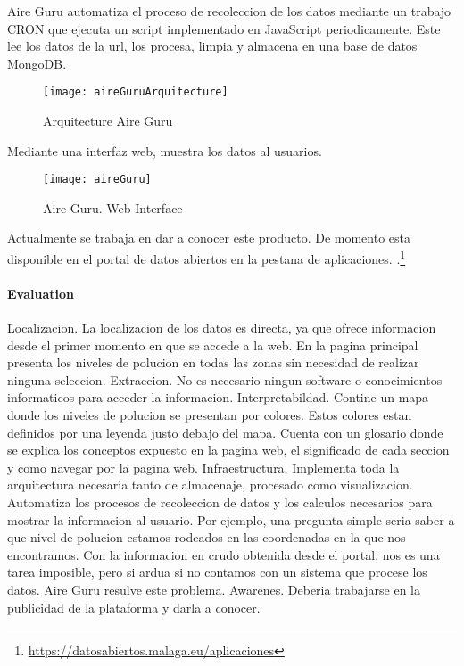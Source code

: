 Aire Guru automatiza el proceso de recoleccion de los datos mediante un trabajo CRON que ejecuta un script implementado en JavaScript periodicamente. Este lee 
los datos de la url, los procesa, limpia y almacena en una base de datos MongoDB.

\begin{figure}[ht]
    \centering
    \texttt{[image: aireGuruArquitecture]}
    \caption{Arquitecture Aire Guru}
\end{figure}

Mediante una interfaz web, muestra los datos al usuarios.

\begin{figure}[ht]
    \centering
    \texttt{[image: aireGuru]}
    \caption{Aire Guru. Web Interface}
\end{figure}

Actualmente se trabaja en dar a conocer este producto. De momento esta disponible en el portal de datos abiertos en la pestana de aplicaciones.
.\footnote{\url{https://datosabiertos.malaga.eu/aplicaciones}}\\


\paragraph{Evaluation} \mbox{}

\begin{itemize}
    \done Localizacion. La localizacion de los datos es directa, ya que ofrece informacion desde el primer momento en que se accede a la web. En la pagina principal
presenta los niveles de polucion en todas las zonas sin necesidad de realizar ninguna seleccion.
\done Extraccion. No es necesario ningun software o conocimientos informaticos para acceder la informacion.
\done Interpretabildad. Contine un mapa donde los niveles de polucion se presentan por colores. Estos colores estan definidos por una leyenda justo
debajo del mapa. Cuenta con un glosario donde se explica los conceptos expuesto en la pagina web, el significado de cada seccion y como
navegar por la pagina web.
\done Infraestructura. Implementa toda la arquitectura necesaria tanto de almacenaje, procesado como visualizacion.
\done Automatiza los procesos de recoleccion de datos y los calculos necesarios para mostrar la informacion al usuario. Por ejemplo, una pregunta simple 
seria saber a que nivel de polucion estamos rodeados en las coordenadas en la que nos encontramos. Con la informacion en crudo obtenida desde el portal, 
nos es una tarea imposible, pero si ardua si no contamos con un sistema que procese los datos. Aire Guru resulve este problema.
\crossed Awarenes. Deberia trabajarse en la publicidad de la plataforma y darla a conocer.
\end{itemize}
\newpage

 


